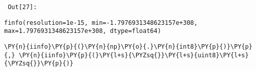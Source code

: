         {\par%
        \vspace{-1\smallerfontscale}%
        \noindent%
        \begin{minipage}{\cellleftmargin}%
    \hfill%
    {\smaller%
    \tt%
    \color{nbframe-out-prompt}%
    Out[27]:}%
    \hspace{\inputpadding}%
    \hspace{0em}%
    \hspace{3pt}%
    \end{minipage}%
        }%
    \begin{addmargin}[\cellleftmargin]{0em}%
    {\smaller%
    \vspace{-1\smallerfontscale}%
    
    
    
    \begin{verbatim}
finfo(resolution=1e-15, min=-1.7976931348623157e+308, max=1.7976931348623157e+308, dtype=float64)
    \end{verbatim}

    
}%
    \end{addmargin}%

{\par%
\vspace{-1\baselineskip}%
}%
\begin{notebookcell}[28]%
\begin{addmargin}[\cellleftmargin]{0em}%
{\smaller%
\par%
%
\vspace{-1\smallerfontscale}%
\begin{Verbatim}[commandchars=\\\{\}]
\PY{n}{iinfo}\PY{p}{(}\PY{n}{np}\PY{o}{.}\PY{n}{int8}\PY{p}{)}\PY{p}{,} \PY{n}{iinfo}\PY{p}{(}\PY{l+s}{\PYZsq{}}\PY{l+s}{uint8}\PY{l+s}{\PYZsq{}}\PY{p}{)}
\end{Verbatim}
%
\par%
\vspace{-1\smallerfontscale}}%
\end{addmargin}
\end{notebookcell}

\par\vspace{1\smallerfontscale}%
    
